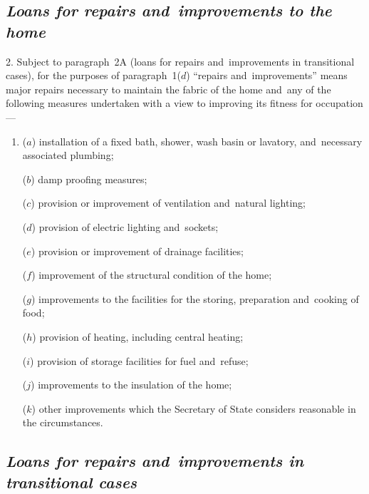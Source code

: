 \documentclass[12pt,a4paper]{article}
\begin{document}
\subsection*{\itshape Loans for repairs and~improvements to the home}

2.  %
Subject to paragraph~2A (loans for repairs and~improvements in transitional cases), for the purposes of  %
paragraph~1($d$) “repairs and~improvements” means major repairs necessary to maintain the fabric of the home and~any of the following measures undertaken with a view to improving its fitness for occupation—
\begin{enumerate}\item[]
($a$) installation of a fixed bath, shower, wash basin or lavatory, and~necessary associated plumbing;

($b$) damp proofing measures;

($c$) provision or improvement of ventilation and~natural lighting;

($d$) provision of electric lighting and~sockets;

($e$) provision or improvement of drainage facilities;

($f$) improvement of the structural condition of the home;

($g$) improvements to the facilities for the storing, preparation and~cooking of food;

($h$) provision of heating, including central heating;

($i$) provision of storage facilities for fuel and~refuse;

($j$) improvements to the insulation of the home;

($k$) other improvements which the 
Secretary of State  %
considers reasonable in the circumstances.
\end{enumerate}


\subsection*{\itshape Loans for repairs and~improvements in transitional cases}
\end{document}
